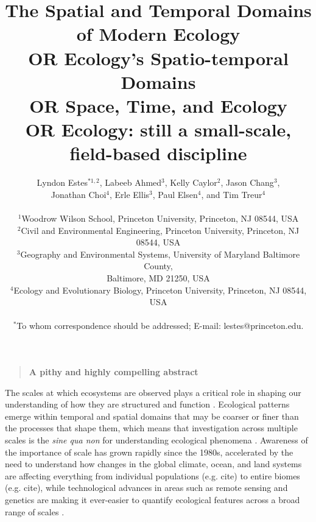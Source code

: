\documentclass[12pt]{article}
\title{The Spatial and Temporal Domains of Modern Ecology \\
OR Ecology's Spatio-temporal Domains\\
OR Space, Time, and Ecology \\
OR Ecology: still a small-scale, field-based discipline}
\author
{Lyndon Estes$^{\ast1, 2}$, Labeeb Ahmed$^{3}$, Kelly Caylor$^{2}$, Jason Chang$^{3}$, \\
Jonathan Choi$^{4}$, Erle Ellis$^{3}$, Paul Elsen$^{4}$, and Tim Treur$^{4}$ \\
\\
\normalsize{$^{1}$Woodrow Wilson School, Princeton University, Princeton, NJ 08544, USA}\\
\normalsize{$^{2}$Civil and Environmental Engineering, Princeton University, Princeton, NJ 08544, USA}\\
\normalsize{$^{3}$Geography and Environmental Systems, University of Maryland Baltimore County,}\\
\normalsize{Baltimore, MD 21250, USA}\\
\normalsize{$^{4}$Ecology and Evolutionary Biology, Princeton University, Princeton, NJ 08544, USA}\\
\\
\normalsize{$^\ast$To whom correspondence should be addressed; E-mail:  lestes@princeton.edu.}
}
\date{}
\newenvironment{sciabstract}{%
\begin{quote} \bf}
{\end{quote}}
\begin{document}
 


\baselineskip24pt


\maketitle 




\begin{sciabstract}
A pithy and highly compelling abstract
\end{sciabstract}

\linenumbers
The scales at which ecosystems are observed plays a critical role in shaping our understanding of how they are structured and function \cite{levin_problem_1992,chave_problem_2013}.  Ecological patterns emerge within temporal and spatial domains that may be coarser or finer than the processes that shape them, which means that investigation across multiple scales is the \emph{sine qua non} for understanding ecological phenomena \cite{levin_problem_1992}. Awareness of the importance of scale has grown rapidly since the 1980s, accelerated by the need to understand how changes in the global climate, ocean, and land systems are affecting everything from individual populations (e.g. cite) to entire biomes (e.g. cite), while technological advances in areas such as remote sensing and genetics are making it ever-easier to quantify ecological features across a broad range of scales \cite{schneider_rise_2001,chave_problem_2013}.  
\end{document}
